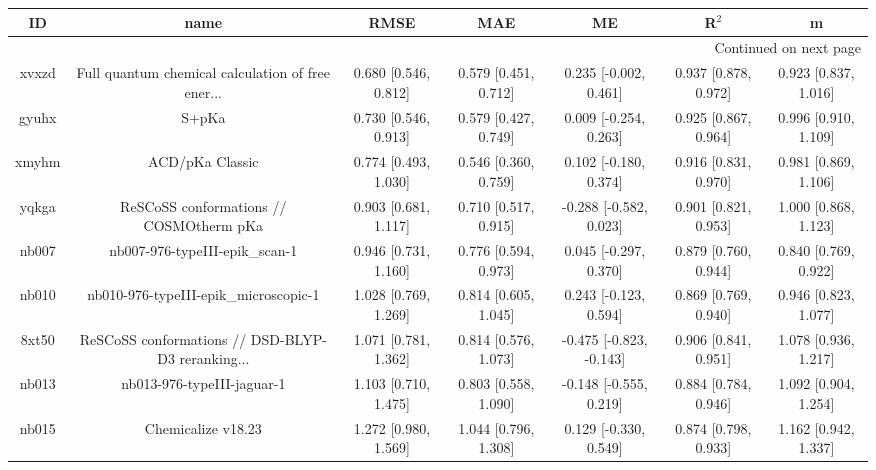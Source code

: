 \documentclass{article}
\begin{document}
\begin{center}
\begin{longtable}{|ccccccc|}
\toprule
    ID &                                               name &                  RMSE &                   MAE &                       ME &                 R$^2$ &                      m \\
\midrule
\endhead
\midrule
\multicolumn{7}{r}{{Continued on next page}} \\
\midrule
\endfoot

\bottomrule
\endlastfoot
 xvxzd &  Full quantum chemical calculation of free ener... &  0.680 [0.546, 0.812] &  0.579 [0.451, 0.712] &    0.235 [-0.002, 0.461] &  0.937 [0.878, 0.972] &   0.923 [0.837, 1.016] \\
 gyuhx &                                              S+pKa &  0.730 [0.546, 0.913] &  0.579 [0.427, 0.749] &    0.009 [-0.254, 0.263] &  0.925 [0.867, 0.964] &   0.996 [0.910, 1.109] \\
 xmyhm &                                    ACD/pKa Classic &  0.774 [0.493, 1.030] &  0.546 [0.360, 0.759] &    0.102 [-0.180, 0.374] &  0.916 [0.831, 0.970] &   0.981 [0.869, 1.106] \\
 yqkga &            ReSCoSS conformations // COSMOtherm pKa &  0.903 [0.681, 1.117] &  0.710 [0.517, 0.915] &   -0.288 [-0.582, 0.023] &  0.901 [0.821, 0.953] &   1.000 [0.868, 1.123] \\
 nb007 &                     nb007-976-typeIII-epik\_scan-1 &  0.946 [0.731, 1.160] &  0.776 [0.594, 0.973] &    0.045 [-0.297, 0.370] &  0.879 [0.760, 0.944] &   0.840 [0.769, 0.922] \\
 nb010 &              nb010-976-typeIII-epik\_microscopic-1 &  1.028 [0.769, 1.269] &  0.814 [0.605, 1.045] &    0.243 [-0.123, 0.594] &  0.869 [0.769, 0.940] &   0.946 [0.823, 1.077] \\
 8xt50 &  ReSCoSS conformations // DSD-BLYP-D3 reranking... &  1.071 [0.781, 1.362] &  0.814 [0.576, 1.073] &  -0.475 [-0.823, -0.143] &  0.906 [0.841, 0.951] &   1.078 [0.936, 1.217] \\
 nb013 &                         nb013-976-typeIII-jaguar-1 &  1.103 [0.710, 1.475] &  0.803 [0.558, 1.090] &   -0.148 [-0.555, 0.219] &  0.884 [0.784, 0.946] &   1.092 [0.904, 1.254] \\
 nb015 &                                 Chemicalize v18.23 &  1.272 [0.980, 1.569] &  1.044 [0.796, 1.308] &    0.129 [-0.330, 0.549] &  0.874 [0.798, 0.933] &   1.162 [0.942, 1.337] \\

\end{longtable}
\end{center}
\end{document}
